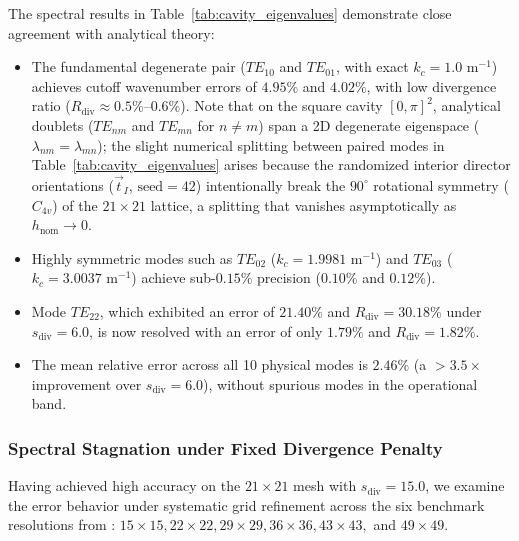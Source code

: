\documentclass[VANCOUVER,Times1COL]{WileyNJD-v5}
\begin{document}
The spectral results in Table~\ref{tab:cavity_eigenvalues} demonstrate close agreement with analytical theory:
\begin{itemize}
    \item The fundamental degenerate pair ($TE_{10}$ and $TE_{01}$, with exact $k_c = 1.0\text{ m}^{-1}$) achieves cutoff wavenumber errors of $4.95\%$ and $4.02\%$, with low divergence ratio ($R_{\mathrm{div}} \approx 0.5\%\text{--}0.6\%$). Note that on the square cavity $[0, \pi]^2$, analytical doublets ($TE_{nm}$ and $TE_{mn}$ for $n \ne m$) span a 2D degenerate eigenspace ($\lambda_{nm} = \lambda_{mn}$); the slight numerical splitting between paired modes in Table~\ref{tab:cavity_eigenvalues} arises because the randomized interior director orientations ($\vec{t}_I$, $\text{seed}=42$) intentionally break the $90^\circ$ rotational symmetry ($C_{4v}$) of the $21\times 21$ lattice, a splitting that vanishes asymptotically as $h_{\mathrm{nom}} \to 0$.
    \item Highly symmetric modes such as $TE_{02}$ ($k_c = 1.9981\text{ m}^{-1}$) and $TE_{03}$ ($k_c = 3.0037\text{ m}^{-1}$) achieve sub-$0.15\%$ precision ($0.10\%$ and $0.12\%$).
    \item Mode $TE_{22}$, which exhibited an error of $21.40\%$ and $R_{\mathrm{div}} = 30.18\%$ under $s_{\mathrm{div}} = 6.0$, is now resolved with an error of only $\mathbf{1.79\%}$ and $R_{\mathrm{div}} = 1.82\%$.
    \item The mean relative error across all 10 physical modes is $\mathbf{2.46\%}$ (a $>3.5\times$ improvement over $s_{\mathrm{div}} = 6.0$), without spurious modes in the operational band.
\end{itemize}

\subsubsection{Spectral Stagnation under Fixed Divergence Penalty}
\label{subsubsec:stagnation_fixed_sdiv}

Having achieved high accuracy on the $21 \times 21$ mesh with $s_{\mathrm{div}} = 15.0$, we examine the error behavior under systematic grid refinement across the six benchmark resolutions from \cite{stable_vnmm2d_2026}: $15 \times 15, 22 \times 22, 29 \times 29, 36 \times 36, 43 \times 43,$ and $49 \times 49$.
\end{document}
